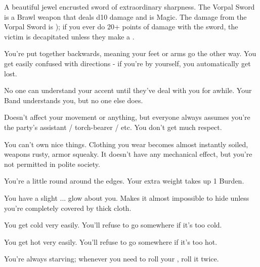 \begin{multicols*}{2}

A beautiful jewel encrusted sword of extraordinary sharpness.  The Vorpal Sword is a \VIG Brawl weapon that deals d10 damage and is Magic. The damage from the Vorpal Sword is ); if you ever do 20+ points of damage with the sword, the victim is decapitated unless they make a .

\newpage



You're put together backwards, meaning your feet or arms go the other way.  You get easily confused with directions - if you're by yourself, you automatically get lost.


No one can understand your accent until they've deal with you for awhile.  Your Band understands you, but no one else does.


Doesn't affect your movement or anything, but everyone always assumes you're the party's assistant / torch-bearer / etc.  You don't get much respect.



You can't own nice things.  Clothing you wear becomes almost instantly soiled, weapons rusty, armor squeaky.  It doesn't have any mechanical effect, but you're not permitted in polite society.


You're a little round around the edges.  Your extra weight takes up 1 Burden.

\cbreak


You have a slight ... glow about you. Makes it almost impossible to hide unless you're completely covered by thick cloth. 


You get cold very easily.  You'll refuse to go somewhere if it's too cold.


You get hot very easily.  You'll refuse to go somewhere if it's too hot.


You're always starving; whenever you need to roll your  \UD, roll it twice.



\end{multicols*}
